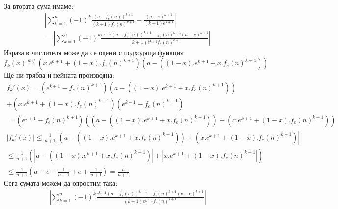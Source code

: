 \begin{solution}
    За втората сума имаме:
    \begin{equation} \label{eq:finite-sum-diff} \tag{$\star\star$}
    \begin{split}
        \left| \sum_{k=1}^n (-1)^{k} \frac{(a-f_e(n))^{k+1}}{(k+1)f_e(n)^{k+1}} - \frac{(a-e)^{k+1}}{(k+1)e^{k+1}} \right| \\
        = \left| \sum_{k=1}^n (-1)^{k} \frac{e^{k+1}(a-f_e(n))^{k+1} - f_e(n)^{k+1}(a-e)^{k+1}}{(k+1)e^{k+1}f_e(n)^{k+1}}\right|
    \end{split}
    \end{equation}
    Израза в числителя може да се оцени с подходяща функция:
    \begin{equation}
        f_k(x) \overset{def}{=} \left(x.e^{k+1} + (1-x).f_e(n)^{k+1}\right)\left(a - \left((1 - x).e^{k+1} + x.f_e(n)^{k+1}\right)\right)
    \end{equation}
    Ще ни трябва и нейната производна:
    \begin{equation}
        \begin{split}
            f_k'(x) = \left(e^{k+1} - f_e(n)^{k+1}\right)\left(a - \left((1 - x).e^{k+1} + x.f_e(n)^{k+1}\right)\right)\\
            + \left(x.e^{k+1} + (1-x).f_e(n)^{k+1}\right)\left(e^{k+1} - f_e(n)^{k+1}\right)\\
            = \left(e^{k+1} - f_e(n)^{k+1}\right)\left( \left(a - \left((1 - x).e^{k+1} + x.f_e(n)^{k+1}\right)\right) + \left(x.e^{k+1} + (1-x).f_e(n)^{k+1}\right) \right)
        \end{split}
    \end{equation}
    \begin{equation}
        \begin{split}
            |f_k'(x)| \leq \frac{1}{n+1}\left|\left(a - \left((1 - x).e^{k+1} + x.f_e(n)^{k+1}\right)\right) + \left(x.e^{k+1} + (1-x).f_e(n)^{k+1}\right) \right|\\
            \leq \frac{1}{n+1}\left(\left|a - \left((1 - x).e^{k+1} + x.f_e(n)^{k+1}\right)\right| + \left|x.e^{k+1} + (1-x).f_e(n)^{k+1}\right|\right) \\
            \leq \frac{1}{n+1}\left(a - e - \frac{1}{n+1} + e + \frac{1}{n+1} \right) = \frac{a}{n+1}
        \end{split}
    \end{equation}
    Сега сумата можем да опростим така:
    \begin{equation}
        \begin{split}
            \left| \sum_{k=1}^n (-1)^{k} \frac{e^{k+1}(a-f_e(n))^{k+1} - f_e(n)^{k+1}(a-e)^{k+1}}{(k+1)e^{k+1}f_e(n)^{k+1}}\right| \\

\end{split}
\end{equation}
\end{solution}
